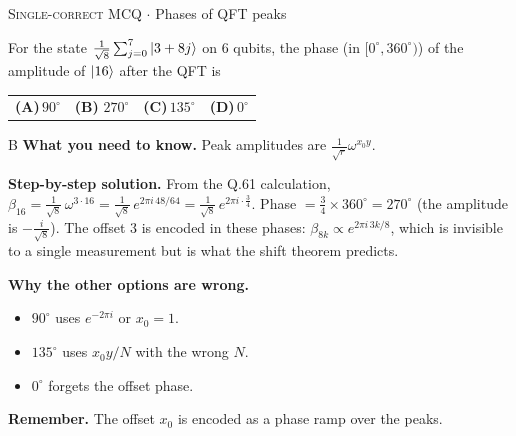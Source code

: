 \documentclass[11pt,a4paper]{article}
\newcommand{\optlabel}[1]{\textbf{(#1)}}
\newcommand{\correctlabel}[1]{\textcolor{okgreen}{\textbf{(#1)}\,\ding{51}}}
\newenvironment{qitem}[1]{\begin{list}{}{\setlength{\leftmargin}{3.3em}\setlength{\labelwidth}{3.1em}%
  \setlength{\labelsep}{0.2em}\setlength{\topsep}{3pt}\setlength{\parsep}{3pt}}\item[\textbf{Q.#1}\hfill]}{\end{list}}
\newcommand{\qsep}{\par\vspace{2pt}{\color{black!15}\hrule}\vspace{4pt}}
\newcommand{\qmeta}[2]{{\footnotesize\color{black!60}\textsc{#1} \;$\cdot$\; #2}\par}
\begin{document}
\begin{qitem}{62}
\qmeta{Single-correct MCQ}{Phases of QFT peaks}
For the state $\frac{1}{\sqrt8}\sum_{j=0}^{7}\ket{3 + 8j}$ on $6$ qubits, the phase (in $[0^\circ, 360^\circ)$) of the amplitude of
$\ket{16}$ after the QFT is
\par\smallskip\noindent\begin{tabularx}{\linewidth}{@{}*{4}{L}@{}}
\optlabel{A}\,$90^\circ$ & \correctlabel{B}\,$270^\circ$ & \optlabel{C}\,$135^\circ$ & \optlabel{D}\,$0^\circ$
\end{tabularx}
\end{qitem}
\begin{solbox}{B}
\textbf{\color{brand}What you need to know.} Peak amplitudes are $\frac{1}{\sqrt r}\omega^{x_0y}$.

\textbf{\color{brand}Step-by-step solution.} From the Q.61 calculation, $\beta_{16} = \frac{1}{\sqrt8}\,\omega^{3\cdot16} = \frac{1}{\sqrt8}\,e^{2\pi i\,48/64} = \frac{1}{\sqrt8}\,e^{2\pi i\cdot\frac34}$.
Phase $= \frac34\times360^\circ = 270^\circ$ (the amplitude is $-\frac{i}{\sqrt8}$). The offset $3$ is encoded in these phases:
$\beta_{8k} \propto e^{2\pi i\,3k/8}$, which is invisible to a single measurement but is what the shift theorem predicts.

\textbf{\color{brand}Why the other options are wrong.}
\begin{itemize}[leftmargin=2.4em, itemsep=1pt, topsep=2pt]
\item[\textbf{(A)}] $90^\circ$ uses $e^{-2\pi i}$ or $x_0 = 1$.
\item[\textbf{(C)}] $135^\circ$ uses $x_0 y/N$ with the wrong $N$.
\item[\textbf{(D)}] $0^\circ$ forgets the offset phase.
\end{itemize}
\textbf{\color{brand}Remember.} The offset $x_0$ is encoded as a phase ramp over the peaks.
\end{solbox}
\qsep
\end{document}

